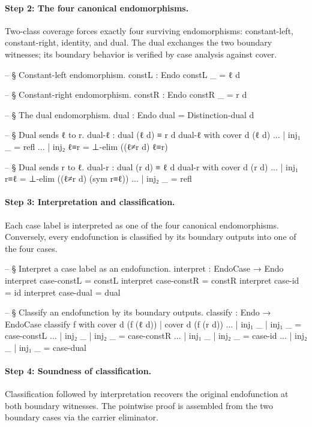 \documentclass[11pt,a4paper]{book}
\def\texttt#1{#1}%
\begin{document}
\paragraph{Step 2: The four canonical endomorphisms.}
Two-class coverage forces exactly four surviving endomorphisms: constant-left, constant-right, identity, and dual.
The dual exchanges the two boundary witnesses; its boundary behavior is verified by case analysis against \texttt{cover}.

\begin{code}
  -- § Constant-left endomorphism.
  constL : Endo
  constL _ = ℓ d

  -- § Constant-right endomorphism.
  constR : Endo
  constR _ = r d

  -- § The dual endomorphism.
  dual : Endo
  dual = Distinction-dual d

  -- § Dual sends ℓ to r.
  dual-ℓ : dual (ℓ d) ≡ r d
  dual-ℓ with cover d (ℓ d)
  ... | inj₁ _   = refl
  ... | inj₂ ℓ≡r = ⊥-elim ((ℓ≠r d) ℓ≡r)

  -- § Dual sends r to ℓ.
  dual-r : dual (r d) ≡ ℓ d
  dual-r with cover d (r d)
  ... | inj₁ r≡ℓ = ⊥-elim ((ℓ≠r d) (sym r≡ℓ))
  ... | inj₂ _   = refl
\end{code}

\paragraph{Step 3: Interpretation and classification.}
Each case label is interpreted as one of the four canonical endomorphisms.
Conversely, every endofunction is classified by its boundary outputs into one of the four cases.

\begin{code}
  -- § Interpret a case label as an endofunction.
  interpret : EndoCase → Endo
  interpret case-constL = constL
  interpret case-constR = constR
  interpret case-id     = id
  interpret case-dual   = dual

  -- § Classify an endofunction by its boundary outputs.
  classify : Endo → EndoCase
  classify f with cover d (f (ℓ d)) | cover d (f (r d))
  ... | inj₁ _ | inj₁ _ = case-constL
  ... | inj₂ _ | inj₂ _ = case-constR
  ... | inj₁ _ | inj₂ _ = case-id
  ... | inj₂ _ | inj₁ _ = case-dual
\end{code}

\paragraph{Step 4: Soundness of classification.}
Classification followed by interpretation recovers the original endofunction at both boundary witnesses.
The pointwise proof is assembled from the two boundary cases via the carrier eliminator.
\end{document}
